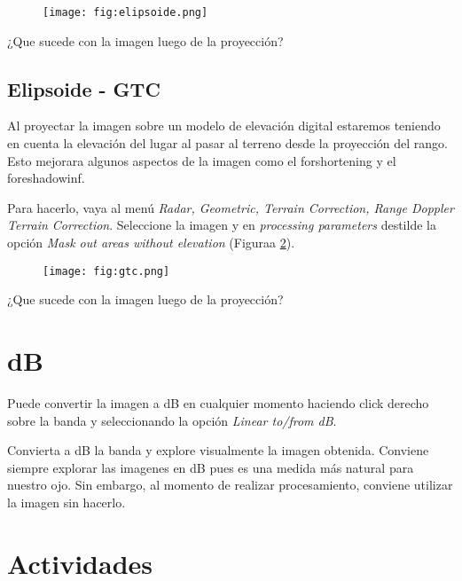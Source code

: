 \begin{figure}[h!]
    \centering
    \texttt{[image: fig:elipsoide.png]}
    \caption{}
    \label{fig:elipsoide}
\end{figure}

\begin{que}
    ¿Que sucede con la imagen luego de la proyección?
\end{que}

\subsection{Elipsoide - GTC}

Al proyectar la imagen sobre un modelo de elevación digital estaremos teniendo en cuenta la elevación del lugar al pasar al terreno desde la proyección del rango. Esto mejorara algunos aspectos de la imagen como el forshortening y el foreshadowinf.

Para hacerlo, vaya al menú \emph{Radar, Geometric, Terrain Correction, Range Doppler Terrain Correction}. Seleccione la imagen  y en \emph{processing parameters} destilde la opción \emph{Mask out areas without elevation} (Figuraa \ref{fig:gtc}).

\begin{figure}[h!]
    \centering
    \texttt{[image: fig:gtc.png]}
    \caption{}
    \label{fig:gtc}
\end{figure}

\begin{que}
    ¿Que sucede con la imagen luego de la proyección?
\end{que}

\section{dB}

Puede convertir la imagen a dB en cualquier momento haciendo click derecho sobre la banda y seleccionando la opción \emph{Linear to/from dB}.

Convierta a dB la banda  y explore visualmente la imagen obtenida. Conviene siempre explorar las imagenes en dB pues es una medida más natural para nuestro ojo. Sin embargo, al momento de realizar procesamiento, conviene utilizar la imagen sin hacerlo.

\section{Actividades}

